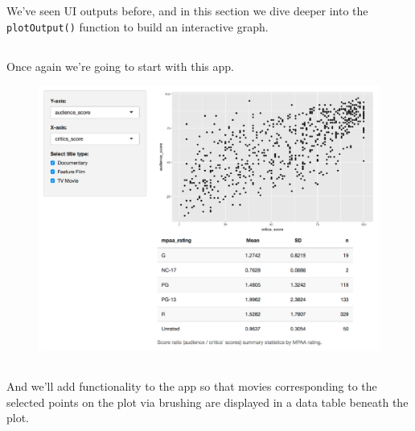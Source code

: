 \documentclass[
  letterpaper,
  DIV=11,
  numbers=noendperiod]{scrreprt}
\begin{document}
We've seen UI outputs before, and in this section we dive deeper into
the \texttt{plotOutput()} function to build an interactive graph.

\hypertarget{section-43}{%
\subsection{}\label{section-43}}

Once again we're going to start with this app.

\begin{figure}

{\centering \includegraphics[width=1\textwidth,height=\textheight]{./images/app-summary-table.png}

}

\end{figure}

\hypertarget{section-44}{%
\subsection{}\label{section-44}}

And we'll add functionality to the app so that movies corresponding to
the selected points on the plot via brushing are displayed in a data
table beneath the plot.
\end{document}
